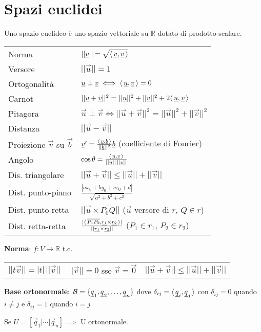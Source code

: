\section{Spazi euclidei}

Uno spazio euclideo è uno spazio vettoriale su $\mathbb{R}$ dotato di prodotto scalare.

\begin{tabular}{ll}
	Norma & $||\underline{v}|| = \sqrt{\langle\,\underline{v},\underline{v}\,\rangle}$ \\
	Versore & $||\vec{u}|| = 1$ \\
	Ortogonalità & $\underline{u} \perp \underline{v} \iff \langle\,\underline{u},\underline{v}\,\rangle = 0$ \\
	Carnot & $||\underline{u}+\underline{v}||^2 = ||\underline{u}||^2+||\underline{v}||^2+2\langle\,\underline{u},\underline{v}\,\rangle$ \\
	Pitagora & $\vec{u} \perp \vec{v} \iff ||\vec{u}+\vec{v}||^2 = ||\vec{u}||^2+||\vec{v}||^2$ \\
	Distanza & $||\vec{u}-\vec{v}||$ \\
	Proiezione $\vec{v}$ su $\vec{b}$ & $\underline{v}' = \frac{\langle\,\underline{v},\underline{b}\,\rangle}{||\underline{b}||^2}\underline{b}$ (coefficiente di Fourier) \\
	Angolo & $\cos \theta = \frac{\langle\,\underline{u},\underline{v}\,\rangle}{||\underline{u}||\,||\underline{v}||}$ \\
	Dis. triangolare & $||\vec{u}+\vec{v}|| \le ||\vec{u}||+||\vec{v}||$ \\
	Dist. punto-piano & $\frac{|ax_0 + by_0 + cz_0 + d|}{\sqrt{a^2 + b^2 + c^2}}$ \\
	Dist. punto-retta & $||\vec{u} \times \overline{P_0Q}||$ ($\vec{u}$ versore di $r$, $Q \in r$) \\
	Dist. retta-retta & $\frac{|\langle\,\overline{P_1P_2},\underline{r_1} \times \underline{r_2}\,\rangle|}{||\underline{r_1} \times \underline{r_2}||}$ ($P_1 \in r_1$, $P_2 \in r_2$)
\end{tabular}

\textbf{Norma}: $f: V \rightarrow \mathbb{R}$ t.c.
\begin{tabular}{lll}
	$||t\vec{v}|| = |t|\,||\vec{v}||$ &
	$||\vec{v}|| = 0$ sse $\vec{v} = \vec{0}$ &
	$||\vec{u}+\vec{v}|| \le ||\vec{u}||+||\vec{v}||$
\end{tabular}

\textbf{Base ortonormale}: $\mathcal{B} = \{\underline{q}_1, \underline{q}_2, \dots, \underline{q}_n\}$ dove $\delta_{ij} = \langle\,\underline{q}_i,\underline{q}_j\,\rangle$ con $\delta_{ij} = 0$ quando $i \ne j$ e $\delta_{ij} = 1$ quando $i = j$

Se $U = [\vec{q}_1 | \cdots | \vec{q}_n] \implies$ U ortonormale.
